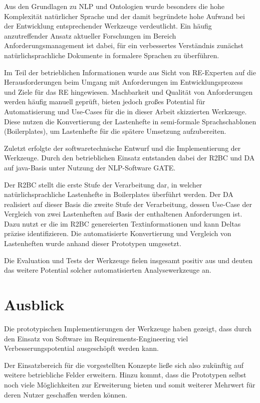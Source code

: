 \documentclass[12pt]{report}
\begin{document}
\vspace{12pt}
Aus den Grundlagen zu NLP und Ontologien wurde besonders die hohe Komplexität natürlicher Sprache und der damit begründete hohe Aufwand bei der Entwicklung entsprechender Werkzeuge verdeutlicht. Ein häufig anzutreffender Ansatz aktueller Forschungen im Bereich Anforderungsmanagement ist dabei, für ein verbessertes Verständnis zunächst natürlichsprachliche Dokumente in formalere Sprachen zu überführen.

Im Teil der betrieblichen Informationen wurde aus Sicht von RE-Experten auf die Herausforderungen beim Umgang mit Anforderungen im Entwicklungsprozess und Ziele für das RE hingewiesen. Machbarkeit und Qualität von Anforderungen werden häufig manuell geprüft, bieten jedoch großes Potential für Automatisierung und Use-Cases für die in dieser Arbeit skizzierten Werkzeuge. Diese nutzen die Konvertierung der Lastenhefte in semi-formale Sprachschablonen (Boilerplates), um Lastenhefte für die spätere Umsetzung aufzubereiten.

Zuletzt erfolgte der softwaretechnische Entwurf und die Implementierung der Werkzeuge. Durch den betrieblichen Einsatz entstanden dabei der R2BC und DA auf java-Basis unter Nutzung der NLP-Software GATE.

Der R2BC stellt die erste Stufe der Verarbeitung dar, in welcher natürlichsprachliche Lastenhefte in Boilerplates überführt werden. Der DA realisiert auf dieser Basis die zweite Stufe der Verarbeitung, dessen Use-Case der Vergleich von zwei Lastenheften auf Basis der enthaltenen Anforderungen ist. Dazu nutzt er die im R2BC genereierten Textinformationen und kann Deltas präzise identifizieren. Die automatisierte Konvertierung und Vergleich von Lastenheften wurde anhand dieser Prototypen umgesetzt. 

\vspace{12pt}
Die Evaluation und Tests der Werkzeuge fielen insgesamt positiv aus und deuten das weitere Potential solcher automatisierten Analysewerkzeuge an.

\section{Ausblick}
Die prototypischen Implementierungen der Werkzeuge haben gezeigt, dass durch den Einsatz von Software im Requirements-Engineering viel Verbesserungspotential ausgeschöpft werden kann. 

Der Einsatzbereich für die vorgestellten Konzepte ließe sich also zukünftig auf weitere betriebliche Felder erweitern. Hinzu kommt, dass die Prototypen selbst noch viele Möglichkeiten zur Erweiterung bieten und somit weiterer Mehrwert für deren Nutzer geschaffen werden können. 
\end{document}
